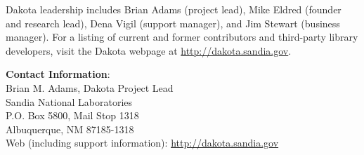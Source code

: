 Dakota leadership includes Brian Adams (project lead), Mike Eldred
(founder and research lead), Dena Vigil (support manager), and Jim
Stewart (business manager).  For a listing of current and former
contributors and third-party library developers, visit the Dakota
webpage at \url{http://dakota.sandia.gov}.

\textbf{Contact Information}:\\
{\small Brian M. Adams, Dakota Project Lead}\\
{\small Sandia National Laboratories}\\
{\small P.O. Box 5800, Mail Stop 1318}\\
{\small Albuquerque, NM 87185-1318}\\
{\small Web (including support information): \url{http://dakota.sandia.gov}}
